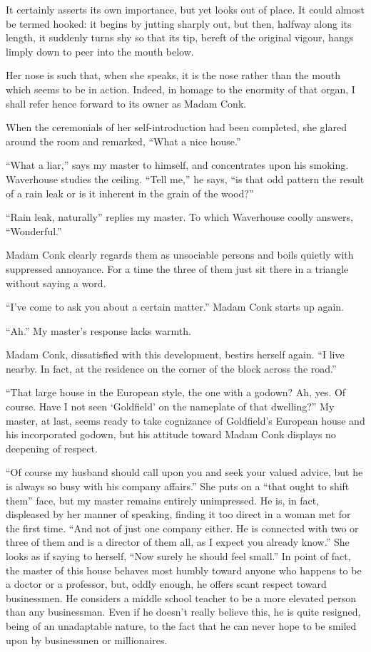 \documentclass{book}
\begin{document}
It certainly asserts its own importance, but yet looks out of place. It
could almost be termed hooked: it begins by jutting sharply out, but
then, halfway along its length, it suddenly turns shy so that its tip,
bereft of the original vigour, hangs limply down to peer into the mouth
below.

Her nose is such that, when she speaks, it is the nose rather than the
mouth which seems to be in action. Indeed, in homage to the enormity of
that organ, I shall refer hence forward to its owner as Madam Conk.

When the ceremonials of her self-introduction had been completed, she
glared around the room and remarked, ``What a nice house.''

``What a liar,'' says my master to himself, and concentrates upon his
smoking. Waverhouse studies the ceiling. ``Tell me,'' he says, ``is that
odd pattern the result of a rain leak or is it inherent in the grain of
the wood?''

``Rain leak, naturally'' replies my master. To which Waverhouse coolly
answers, ``Wonderful.''

Madam Conk clearly regards them as unsociable persons and boils quietly
with suppressed annoyance. For a time the three of them just sit there
in a triangle without saying a word.

``I've come to ask you about a certain matter.'' Madam Conk starts up
again.

``Ah.'' My master's response lacks warmth.

Madam Conk, dissatisfied with this development, bestirs herself again.
``I live nearby. In fact, at the residence on the corner of the block
across the road.''

``That large house in the European style, the one with a godown? Ah,
yes. Of course. Have I not seen `Goldfield' on the nameplate of that
dwelling?'' My master, at last, seems ready to take cognizance of
Goldfield's European house and his incorporated godown, but his attitude
toward Madam Conk displays no deepening of respect.

``Of course my husband should call upon you and seek your valued advice,
but he is always so busy with his company affairs.'' She puts on a
``that ought to shift them'' face, but my master remains entirely
unimpressed. He is, in fact, displeased by her manner of speaking,
finding it too direct in a woman met for the first time. ``And not of
just one company either. He is connected with two or three of them and
is a director of them all, as I expect you already know.'' She looks as
if saying to herself, ``Now surely he should feel small.'' In point of
fact, the master of this house behaves most humbly toward anyone who
happens to be a doctor or a professor, but, oddly enough, he offers
scant respect toward businessmen. He considers a middle school teacher
to be a more elevated person than any businessman. Even if he doesn't
really believe this, he is quite resigned, being of an unadaptable
nature, to the fact that he can never hope to be smiled upon by
businessmen or millionaires.
\end{document}
